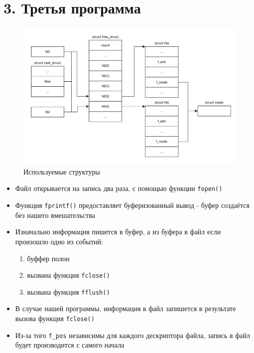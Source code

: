 \clearpage

\section*{3. Третья программа}

\begin{figure}[h!btp]
	\centering
	\includegraphics[width=470pt]{inc/scheme2.pdf}
	\caption{Используемые структуры}
	\label{fig:scheme3}	
\end{figure}

\begin{itemize}
	\item Файл открывается на запись два раза, с помощью функции \texttt{fopen()}

	\item Функция \texttt{fprintf()} предоставляет буферизованный вывод - буфер создаётся без нашего вмешательства

	\item Изначально информация пишется в буфер, а из буфера в файл если произошло одно из
	событий:
	\begin{enumerate}
		\item буффер полон
		\item вызвана функция \texttt{fclose()}
		\item вызвана функция \texttt{fflush()}
	\end{enumerate}

	\item В случае нашей программы, информация в файл запишется в результате вызова функция \texttt{fclose()}

	\item Из-за того \texttt{f\_pos} независимы для каждого дескриптора файла, запись в файл будет производится с самого начала
\end{itemize}

